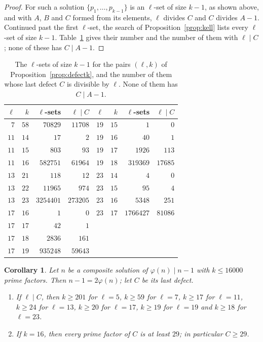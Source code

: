 \documentclass[11pt,reqno]{amsart}
\numberwithin{equation}{section}
\theoremstyle{plain}
\newtheorem{corollary}[theorem]{Corollary}
\theoremstyle{definition}
\theoremstyle{remark}
\begin{document}
\begin{proof}
For such a solution $\{p_1,\dots,p_{k-1}\}$ is an $\ell$-set of size
$k-1$, as shown above, and with $A$, $B$ and $C$ formed from its
elements, $\ell$ divides $C$ and $C$ divides $A-1$. Continued past the
first $\ell$-set, the search of Proposition~\ref{prop:kell} lists every
$\ell$-set of size $k-1$. Table~\ref{tab:defect} gives their number
and the number of them with $\ell\mid C$; none of these has
$C\mid A-1$.
\end{proof}

\begin{table}[t]
\centering
\caption{The $\ell$-sets of size $k-1$ for the pairs $(\ell,k)$ of
Proposition~\ref{prop:defectk}, and the number of them whose last
defect $C$ is divisible by $\ell$. None of them has $C\mid A-1$.}
\label{tab:defect}
\begin{tabular}{rrrr@{\qquad}rrrr}
\toprule
$\ell$ & $k$ & $\ell$-sets & $\ell\mid C$ & $\ell$ & $k$ & $\ell$-sets & $\ell\mid C$\\
\midrule
$7$ & $58$ & $70829$ & $11708$ & $19$ & $15$ & $1$ & $0$\\
$11$ & $14$ & $17$ & $2$ & $19$ & $16$ & $40$ & $1$\\
$11$ & $15$ & $803$ & $93$ & $19$ & $17$ & $1926$ & $113$\\
$11$ & $16$ & $582751$ & $61964$ & $19$ & $18$ & $319369$ & $17685$\\
$13$ & $21$ & $118$ & $12$ & $23$ & $14$ & $4$ & $0$\\
$13$ & $22$ & $11965$ & $974$ & $23$ & $15$ & $95$ & $4$\\
$13$ & $23$ & $3254401$ & $273205$ & $23$ & $16$ & $5348$ & $251$\\
$17$ & $16$ & $1$ & $0$ & $23$ & $17$ & $1766427$ & $81086$\\
$17$ & $17$ & $42$ & $1$ & & & &\\
$17$ & $18$ & $2836$ & $161$ & & & &\\
$17$ & $19$ & $935248$ & $59643$ & & & &\\
\bottomrule
\end{tabular}
\end{table}

\begin{corollary}\label{cor:defect}
Let $n$ be a composite solution of $\varphi(n)\mid n-1$ with $k\le16000$
prime factors. Then $n-1=2\varphi(n)$; let $C$ be its last defect.
\begin{enumerate}[label=\textup{(\roman*)}]
\item If $\ell\mid C$, then $k\ge201$ for $\ell=5$, $k\ge59$ for
$\ell=7$, $k\ge17$ for $\ell=11$, $k\ge24$ for $\ell=13$, $k\ge20$ for
$\ell=17$, $k\ge19$ for $\ell=19$ and $k\ge18$ for $\ell=23$.
\item If $k=16$, then every prime factor of $C$ is at least $29$; in
particular $C\ge29$.
\end{enumerate}
\end{corollary}
\end{document}
